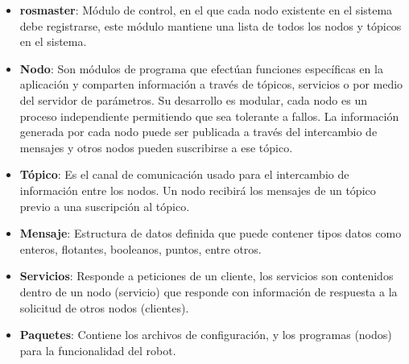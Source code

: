 \begin{itemize}\setlength{\itemsep}{-1mm}
\item \textbf{rosmaster}: Módulo de control, en el que cada nodo existente en el sistema debe registrarse, este módulo mantiene una lista de todos los nodos y tópicos en el sistema.
\item \textbf{Nodo}: Son módulos de programa que efectúan funciones específicas en la aplicación y comparten información a través de tópicos, servicios o por medio del servidor de parámetros. Su desarrollo es modular, cada nodo es un proceso independiente permitiendo que sea tolerante a fallos. La información generada por cada nodo puede ser publicada a través del intercambio de mensajes y otros nodos pueden suscribirse a ese tópico.
\item \textbf{Tópico}: Es el canal de comunicación usado para el intercambio de información entre los nodos. Un nodo recibirá los mensajes de un tópico previo a una suscripción al tópico.
\item \textbf{Mensaje}: Estructura de datos definida que puede contener tipos datos como enteros, flotantes, booleanos, puntos, entre otros.
\item \textbf{Servicios}: Responde a peticiones de un cliente, los servicios son contenidos dentro de un nodo (servicio) que responde con información de respuesta a la solicitud de otros nodos (clientes). 
\item \textbf{Paquetes}: Contiene los archivos de configuración, y los programas (nodos) para la funcionalidad del robot.
  
\end{itemize}



